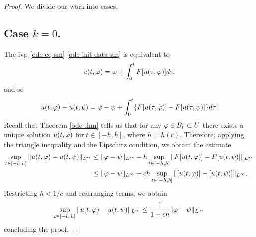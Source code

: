 \begin{proof}
  We divide our work into cases.
  \subsection{Case $k = 0$.} The ivp \eqref{ode-eq-sm}-\eqref{ode-init-data-sm} is equivalent to 
  \begin{equation*}
  \begin{split}
  u(t, \varphi) = \varphi + \int_{0}^{t} F[u(\tau, \varphi)] d \tau.
  \end{split}
  \end{equation*}
  and so
  \begin{equation*}
    \begin{split}
  u(t, \varphi) - u(t, \psi) = \varphi - \psi + \int_{0}^{t} \{F[u(\tau, \varphi)] - F[u(\tau, \psi)]\} d \tau.
  \end{split}
  \end{equation*}
 Recall that Theorem \ref{ode-thm} tells us that for any $\varphi \in B_{r} \subset U$ there exists a unique solution $u(t, \varphi)$ for $t \in [-h, h]$, where $h = h(r)$. Therefore, applying the triangle inequality and the Lipschitz condition, we obtain the estimate
  \begin{equation*}
  \begin{split}
  \sup_{t \in [-h, h]} \|u(t, \varphi) - u(t, \psi)\|_{L^{\infty}}
  & \le \|\varphi -
  \psi\|_{L^{\infty}} +  h \sup_{t \in [-h, h]} \|F[u(t, \varphi)] - F[u(t, \psi)] \|_{L^{\infty}}
  \\
  & \le \|\varphi - \psi\|_{L^{\infty}} +  ch \sup_{t \in [-h, h]} \|[u(t, \varphi)] -
  [u(t, \psi)] \|_{L^{\infty}}.
  \end{split}
  \end{equation*}
Restricting $h < 1/c$ and rearranging terms, we obtain
%
%
\begin{equation*}
\begin{split}
\sup_{t \in [-h, h]} \| u(t, \varphi) - u(t, \psi) \|_{L^{\infty}} \le \frac{1}{1-ch} \| \varphi - \psi \|_{L^{\infty}}
\end{split}
\end{equation*}
%
%
concluding the proof.

\end{proof}
